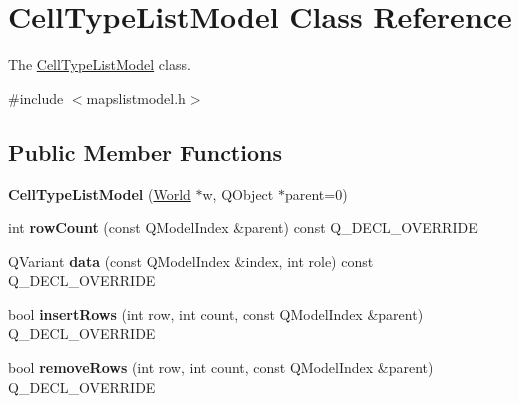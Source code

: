 \hypertarget{class_cell_type_list_model}{\section{\-Cell\-Type\-List\-Model \-Class \-Reference}
\label{class_cell_type_list_model}
}


\-The \hyperlink{class_cell_type_list_model}{\-Cell\-Type\-List\-Model} class.  




{\ttfamily \#include $<$mapslistmodel.\-h$>$}

\subsection*{\-Public \-Member \-Functions}
\begin{DoxyCompactItemize}
\item 
\hypertarget{class_cell_type_list_model_a3e5614c6b52577d4d673ac28e5b19c59}{{\bfseries \-Cell\-Type\-List\-Model} (\hyperlink{class_world}{\-World} $\ast$w, \-Q\-Object $\ast$parent=0)}\label{class_cell_type_list_model_a3e5614c6b52577d4d673ac28e5b19c59}

\item 
\hypertarget{class_cell_type_list_model_a4d19e3ec13380dc4ecfea9ceafdc78b9}{int {\bfseries row\-Count} (const \-Q\-Model\-Index \&parent) const \-Q\-\_\-\-D\-E\-C\-L\-\_\-\-O\-V\-E\-R\-R\-I\-D\-E}\label{class_cell_type_list_model_a4d19e3ec13380dc4ecfea9ceafdc78b9}

\item 
\hypertarget{class_cell_type_list_model_a949e9fd005335e0024fb66f63113078d}{\-Q\-Variant {\bfseries data} (const \-Q\-Model\-Index \&index, int role) const \-Q\-\_\-\-D\-E\-C\-L\-\_\-\-O\-V\-E\-R\-R\-I\-D\-E}\label{class_cell_type_list_model_a949e9fd005335e0024fb66f63113078d}

\item 
\hypertarget{class_cell_type_list_model_aeff00ffac0dd7bce76a505d2eabfed49}{bool {\bfseries insert\-Rows} (int row, int count, const \-Q\-Model\-Index \&parent) \-Q\-\_\-\-D\-E\-C\-L\-\_\-\-O\-V\-E\-R\-R\-I\-D\-E}\label{class_cell_type_list_model_aeff00ffac0dd7bce76a505d2eabfed49}

\item 
\hypertarget{class_cell_type_list_model_abe5727a0615f06531cfa271a607785a4}{bool {\bfseries remove\-Rows} (int row, int count, const \-Q\-Model\-Index \&parent) \-Q\-\_\-\-D\-E\-C\-L\-\_\-\-O\-V\-E\-R\-R\-I\-D\-E}\label{class_cell_type_list_model_abe5727a0615f06531cfa271a607785a4}

\end{DoxyCompactItemize}


